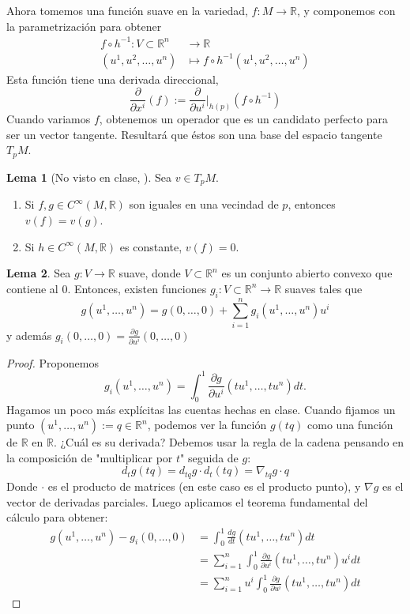 \documentclass[spanish]{book}
\theoremstyle{definition}
\newtheorem*{lema}{Lema}
\newcommand{\R}{\mathbb{R}}
\newcommand{\Cinf}{C^\infty}
\begin{document}
Ahora tomemos una función suave en la variedad, $f:M\to\R$, y componemos con la parametrización para obtener
\begin{align*}
	f\circ h^{-1}:V\subset\R^n&\to\R\\
	(u^1,u^2,\ldots,u^n)&\mapsto f\circ h^{-1}(u^1,u^2,\ldots,u^n)
\end{align*}
Esta función tiene una derivada direccional,
\[\frac{\partial}{\partial x^i}(f):=\frac{\partial}{\partial u^i}\Big|_{h(p)}(f\circ h^{-1})\]
Cuando variamos $f$, obtenemos un operador que es un candidato perfecto para ser un vector tangente. Resultará que éstos son una base del espacio tangente $T_pM$.
\begin{lema}[No visto en clase, \cite{ONeill}]
	Sea $v\in T_pM$.
	\begin{enumerate}
		\item Si $f,g\in\Cinf(M,\R)$ son iguales en una vecindad de $p$, entonces $v(f)=v(g)$.
		\item Si $h\in\Cinf(M,\R)$ es constante, $v(f)=0$.
	\end{enumerate}
\end{lema}
\begin{lema}
	Sea $g:V\to\R$ suave, donde $V\subset\R^n$ es un conjunto abierto convexo que contiene al $0$. Entonces, existen funciones $g_i:V\subset\R^n\to\R$ suaves tales que
	\[g(u^1,\ldots,u^n)=g(0,\ldots,0)+\sum_{i=1}^ng_i(u^1,\ldots,u^n)u^i\]
	y además $g_i(0,\ldots,0)=\frac{\partial g}{\partial u^i}(0,\ldots,0)$
\end{lema}
\begin{proof}
	Proponemos
	\[g_i(u^1,\ldots,u^n)=\int_0^1\frac{\partial g}{\partial u^i}(tu^1,\ldots,tu^n)dt.\]
	Hagamos un poco más explícitas las cuentas hechas en clase. Cuando fijamos un punto $(u^1,\ldots,u^n):=q\in\R^n$, podemos ver la función $g(tq)$ como una función de $\R$ en $\R$. ¿Cuál es su derivada? Debemos usar la regla de la cadena pensando en la composición de "multiplicar por $t$" seguida de $g$:
	\[d_t g(tq)=d_{tq}g\cdot d_t(tq)=\nabla_{tq}g\cdot q\]
	Donde $\cdot$ es el producto de matrices (en este caso es el producto punto), y $\nabla g$ es el vector de derivadas parciales. Luego aplicamos el teorema fundamental del cálculo para obtener:
	\begin{align*}
		g(u^1,\ldots,u^n)-g_i(0,\ldots,0)&=\int_0^1\frac{dg}{dt}(tu^1,\ldots,tu^n)dt\\
		&=\sum_{i=1}^n\int_0^1\frac{\partial g}{\partial u^i}(tu^1,\ldots,tu^n)u^idt\\
		&=\sum_{i=1}^nu^i\int_0^1\frac{\partial g}{\partial u^i}(tu^1,\ldots,tu^n)dt
	\end{align*}
\end{proof}
\end{document}
